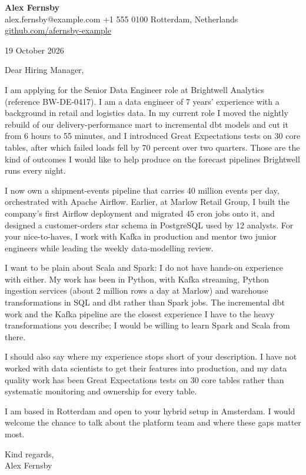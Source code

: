 \documentclass[11pt,a4paper]{article}
\begin{document}
\textbf{Alex Fernsby}\\
alex.fernsby@example.com \quad +1 555 0100 \quad Rotterdam, Netherlands\\
\href{https://github.com/afernsby-example}{github.com/afernsby-example}

19 October 2026

Dear Hiring Manager,

I am applying for the Senior Data Engineer role at Brightwell Analytics (reference BW-DE-0417). I am a
data engineer of 7 years' experience with a background in retail and logistics data. In my current role I
moved the nightly rebuild of our delivery-performance mart to incremental dbt models and cut it from 6
hours to 55 minutes, and I introduced Great Expectations tests on 30 core tables, after which failed
loads fell by 70 percent over two quarters. Those are the kind of outcomes I would like to help produce
on the forecast pipelines Brightwell runs every night.

I now own a shipment-events pipeline that carries 40 million events per day, orchestrated with Apache
Airflow. Earlier, at Marlow
Retail Group, I built the company's first Airflow deployment and migrated 45 cron jobs onto it, and
designed a customer-orders star schema in PostgreSQL used by 12 analysts. For your nice-to-haves, I work
with Kafka in production and mentor two junior engineers while leading the weekly data-modelling review.

I want to be plain about Scala and Spark: I do not have hands-on experience with either. My work has been
in Python, with Kafka streaming, Python ingestion services (about 2 million rows a day at Marlow) and
warehouse transformations in SQL and dbt rather than Spark jobs. The incremental dbt work and the Kafka
pipeline are the closest experience I have to the heavy transformations you describe; I would be willing
to learn Spark and Scala from there.

I should also say where my experience stops short of your description. I have not worked with
data scientists to get their features into production, and my data quality work has been Great
Expectations tests on 30 core tables rather than systematic monitoring and ownership for every table.

I am based in Rotterdam and open to your hybrid setup in Amsterdam. I would welcome the chance to talk
about the platform team and where these gaps matter most.

Kind regards,\\
Alex Fernsby
\end{document}
